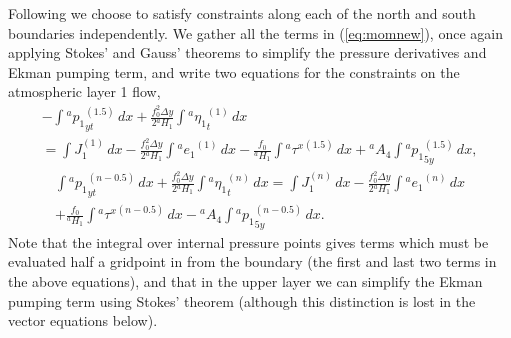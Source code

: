 \documentclass[11pt, a4paper,twoside]{article}
\newcommand{\etb}[2]{{{}^{#1}\eta_{#2}}}
\newcommand{\p}[2]{{{}^{#1}p_{#2}}}
\newcommand{\HH}[2]{{{}^{#1}H_{#2}}}
\newcommand{\ah}[1]{{{}^{#1}A_4}}
\newcommand{\e}[2]{{{}^{#1}e_{#2}}}
\newcommand{\tx}[2]{{}^{#1}\tau^{#2}}
\numberwithin{equation}{section}
\begin{document}
Following \citet{mcwilliams:77} we choose to satisfy constraints along each of the north and south boundaries independently.
We gather all the terms in (\ref{eq:momnew}), once again applying Stokes' and Gauss' theorems to simplify the pressure derivatives and Ekman pumping term, and write two equations for the constraints on the atmospheric layer 1 flow,
\begin{multline}\label{eq:south1}
- \int \p{a}{1}_{yt}^{(1.5)}\, dx  + \frac{f_0^2 \Delta y}{2 \HH{a}{1}}\int \etb{a}{1}_t^{(1)} \, dx \\
=  \int J_1^{(1)}\, dx - \frac{f_0^2 \Delta y}{2 \HH{a}{1}}\int \e{a}{1}^{(1)}\, dx - \frac{f_0}{\HH{a}{1}}\int {\tx{a}{x}}^{(1.5)} \, dx  + \ah{a} \int \p{a}{1}_{5y}^{(1.5)}\, dx,
\end{multline}
\begin{multline}\label{eq:north1}
\int \p{a}{1}_{yt}^{(n-0.5)}\, dx  + \frac{f_0^2 \Delta y}{2 \HH{a}{1}}\int \etb{a}{1}_t^{(n)} \, dx = \int J_1^{(n)}\, dx - \frac{f_0^2 \Delta y}{2 \HH{a}{1}}\int \e{a}{1}^{(n)}\, dx \\
+ \frac{f_0}{\HH{a}{1}}\int {\tx{a}{x}}^{(n-0.5)} \, dx  - \ah{a} \int \p{a}{1}_{5y}^{(n-0.5)}\, dx.
\end{multline}
Note that the integral over internal pressure points gives terms which must be evaluated half a gridpoint in from the boundary (the first and last two terms in the above equations), and that in the upper layer we can simplify the Ekman pumping term using Stokes' theorem (although this distinction is lost in the vector equations below).
\end{document}
